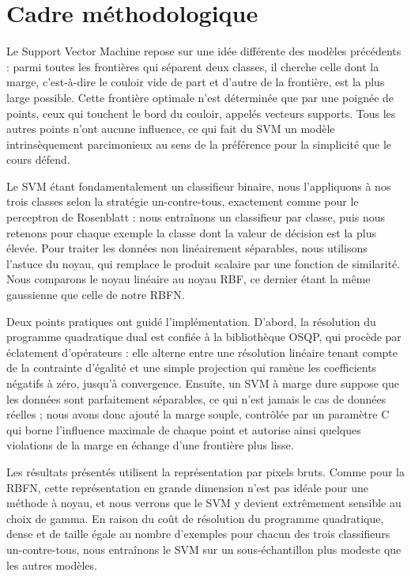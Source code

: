 \documentclass[11pt,a4paper]{report}
\begin{document}
\hypertarget{cadre-muxe9thodologique-3}{%
\section{Cadre méthodologique}\label{cadre-muxe9thodologique-3}}

Le Support Vector Machine repose sur une idée différente des modèles
précédents : parmi toutes les frontières qui séparent deux classes, il
cherche celle dont la marge, c'est-à-dire le couloir vide de part et
d'autre de la frontière, est la plus large possible. Cette frontière
optimale n'est déterminée que par une poignée de points, ceux qui
touchent le bord du couloir, appelés vecteurs supports. Tous les autres
points n'ont aucune influence, ce qui fait du SVM un modèle
intrinsèquement parcimonieux au sens de la préférence pour la simplicité
que le cours défend.

Le SVM étant fondamentalement un classifieur binaire, nous l'appliquons
à nos trois classes selon la stratégie un-contre-tous, exactement comme
pour le perceptron de Rosenblatt : nous entraînons un classifieur par
classe, puis nous retenons pour chaque exemple la classe dont la valeur
de décision est la plus élevée. Pour traiter les données non
linéairement séparables, nous utilisons l'astuce du noyau, qui remplace
le produit scalaire par une fonction de similarité. Nous comparons le
noyau linéaire au noyau RBF, ce dernier étant la même gaussienne que
celle de notre RBFN.

Deux points pratiques ont guidé l'implémentation. D'abord, la résolution
du programme quadratique dual est confiée à la bibliothèque OSQP, qui
procède par éclatement d'opérateurs : elle alterne entre une résolution
linéaire tenant compte de la contrainte d'égalité et une simple
projection qui ramène les coefficients négatifs à zéro, jusqu'à
convergence. Ensuite, un SVM à marge dure suppose que les données sont
parfaitement séparables, ce qui n'est jamais le cas de données réelles ;
nous avons donc ajouté la marge souple, contrôlée par un paramètre C qui
borne l'influence maximale de chaque point et autorise ainsi quelques
violations de la marge en échange d'une frontière plus lisse.

Les résultats présentés utilisent la représentation par pixels bruts.
Comme pour la RBFN, cette représentation en grande dimension n'est pas
idéale pour une méthode à noyau, et nous verrons que le SVM y devient
extrêmement sensible au choix de gamma. En raison du coût de résolution
du programme quadratique, dense et de taille égale au nombre d'exemples
pour chacun des trois classifieurs un-contre-tous, nous entraînons le
SVM sur un sous-échantillon plus modeste que les autres modèles.
\end{document}
